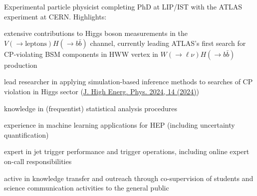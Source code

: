 
Experimental particle physicist completing PhD at LIP/IST with the ATLAS experiment at CERN. Highlights:

\begin{cvitems}
    \item[]\vspace{-0.5\baselineskip}
    \item extensive contributions to Higgs boson measurements in the $V(\to \textrm{leptons}) H(\to b\bar{b})$ channel, currently leading ATLAS's first search for CP-violating BSM components in HWW vertex in $W(\to \ell \nu) H(\to b\bar{b})$ production
    \item lead researcher in applying simulation-based inference methods to searches of CP violation in Higgs sector (\href{https://doi.org/10.1007/JHEP04(2024)014}{J. High Energ. Phys. 2024, 14 (2024)})
    \item knowledge in (frequentist) statistical analysis procedures
    \item experience in machine learning applications for HEP (including uncertainty quantification)
    \item expert in jet trigger performance and trigger operations, including online expert on-call responsibilities
    \item active in knowledge transfer and outreach through co-supervision of students and science communication activities to the general public
    \item[]\vspace{-0.5\baselineskip}
\end{cvitems}
